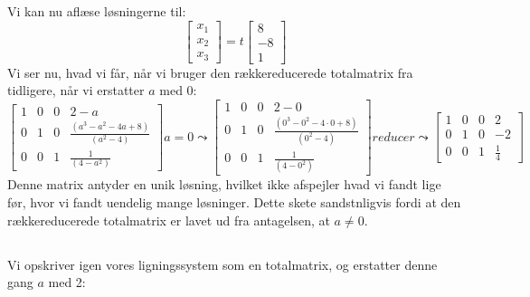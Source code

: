 \documentclass[a4paper,12pt]{article}
\begin{document}
Vi kan nu aflæse løsningerne til:
\[
\left[\begin{array}{c}
    x_1 \\
    x_2 \\
    x_3
\end{array}\right]
=
t
\left[\begin{array}{c}
    8 \\
    -8 \\
    1
\end{array}\right]
\]
Vi ser nu, hvad vi får, når vi bruger den rækkereducerede totalmatrix fra tidligere, når vi erstatter $a$ med 0:\\

$
\left[\begin{array}{ccc|c}
    1 & 0 & 0 & 2-a \\
    0 & 1 & 0 & \frac{(a^3 - a^2 - 4a + 8)}{(a^2 - 4)} \\
    0 & 0 & 1 & \frac{1}{(4-a^2)}
\end{array}\right]
a=0
\leadsto
\left[\begin{array}{ccc|c}
    1 & 0 & 0 & 2-0 \\
    0 & 1 & 0 & \frac{(0^3 - 0^2 - 4\cdot0 + 8)}{(0^2 - 4)} \\
    0 & 0 & 1 & \frac{1}{(4-0^2)}
\end{array}\right]
reducer
\leadsto
\left[\begin{array}{ccc|c}
    1 & 0 & 0 & 2 \\
    0 & 1 & 0 & -2 \\
    0 & 0 & 1 & \frac{1}{4}
\end{array}\right]
$\\

Denne matrix antyder en unik løsning, hvilket ikke afspejler hvad vi fandt lige før, hvor vi fandt uendelig mange løsninger. Dette skete sandstnligvis fordi at den rækkereducerede totalmatrix er lavet ud fra antagelsen, at $a \neq 0$.

\subsection{}
Vi opskriver igen vores ligningssystem som en totalmatrix, og erstatter denne gang $a$ med 2:\\
\end{document}
